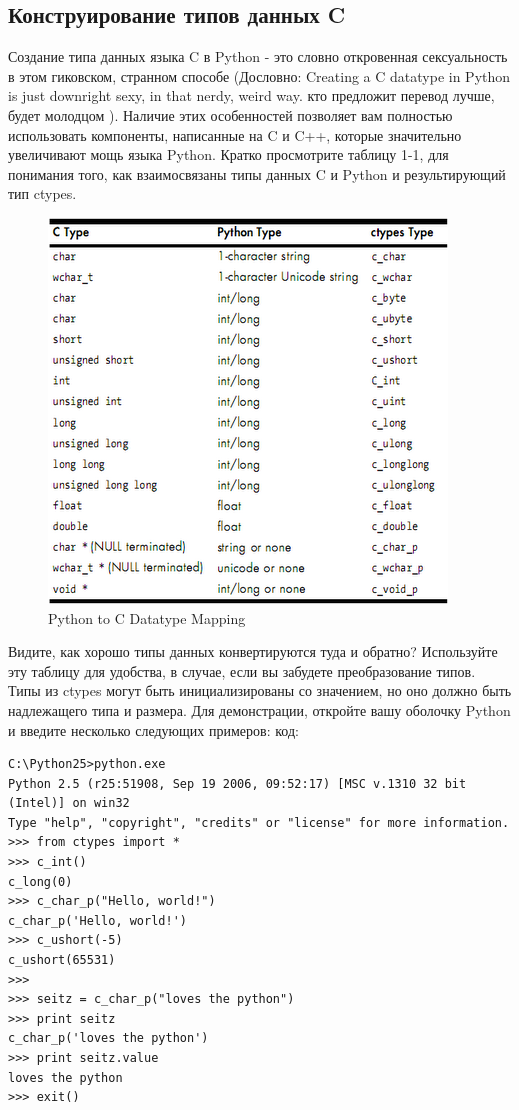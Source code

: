 \documentclass[12pt]{book}
\begin{document}
\subsection{Конструирование типов данных C}

Создание типа данных языка C в Python - это словно откровенная сексуальность в этом гиковском, странном способе (Дословно: Creating a C datatype in Python is just downright sexy, in that nerdy, weird way. кто предложит перевод лучше, будет молодцом ). Наличие этих особенностей позволяет вам полностью использовать компоненты, написанные на C и C++, которые значительно увеличивают мощь языка Python. Кратко просмотрите таблицу 1-1, для понимания того, как взаимосвязаны типы данных C и Python и результирующий тип ctypes.

\begin{figure}
  \center
  \includegraphics{./pic/chap1/1.PNG}
  \caption{Python to C Datatype Mapping}
\end{figure}

Видите, как хорошо типы данных конвертируются туда и обратно? Используйте эту таблицу для удобства, в случае, если вы забудете преобразование типов. Типы из ctypes могут быть инициализированы со значением, но оно должно быть надлежащего типа и размера. Для демонстрации, откройте вашу оболочку Python и введите несколько следующих примеров:
код:
\begin{lstlisting}
C:\Python25>python.exe
Python 2.5 (r25:51908, Sep 19 2006, 09:52:17) [MSC v.1310 32 bit (Intel)] on win32
Type "help", "copyright", "credits" or "license" for more information.
>>> from ctypes import *
>>> c_int()
c_long(0)
>>> c_char_p("Hello, world!")
c_char_p('Hello, world!')
>>> c_ushort(-5)
c_ushort(65531)
>>>
>>> seitz = c_char_p("loves the python")
>>> print seitz
c_char_p('loves the python')
>>> print seitz.value
loves the python
>>> exit()
\end{lstlisting}
\end{document}
